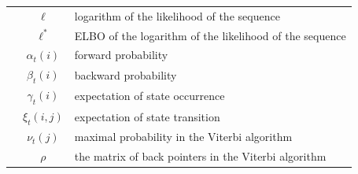 \documentclass[shortabstract]{iithesis}
\begin{document}
\begin{table}[!ht]
\begin{tabular}{ |c|c|p{9.5cm}| }
    & $\ell$ & logarithm of the likelihood of the sequence \\
    & $\ell^*$ & ELBO of the  logarithm of the likelihood of the sequence \\
    & $\alpha_t(i)$ & forward probability \\
    & $\beta_t(i)$ & backward probability \\
    & $\gamma_t(i)$ & expectation of state occurrence \\
    & $\xi_t(i, j)$ & expectation of state transition \\
    & $\nu_t(j)$ & maximal probability in the Viterbi algorithm  \\
    & $\rho$ & the matrix of back pointers in the Viterbi algorithm \\ \hline
    \end{tabular}
    \end{table}

\pagebreak
\end{document}
